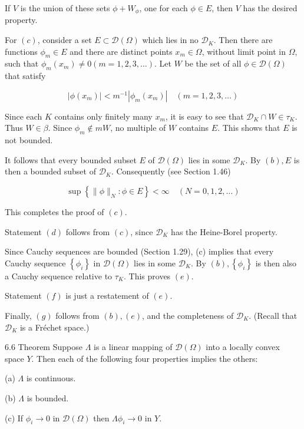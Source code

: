 \documentclass[10pt]{article}
\begin{document}
If $V$ is the union of these sets $\phi+W_{\phi}$, one for each $\phi \in E$, then $V$ has the desired property.

For $(c)$, consider a set $E \subset \mathscr{D}(\Omega)$ which lies in no $\mathscr{D}_{K}$. Then there are functions $\phi_{m} \in E$ and there are distinct points $x_{m} \in \Omega$, without limit point in $\Omega$, such that $\phi_{m}\left(x_{m}\right) \neq 0(m=1,2,3, \ldots)$. Let $W$ be the set of all $\phi \in \mathscr{D}(\Omega)$ that satisfy

$$
\left|\phi\left(x_{m}\right)\right|<m^{-1}\left|\phi_{m}\left(x_{m}\right)\right| \quad(m=1,2,3, \ldots)
$$

Since each $K$ contains only finitely many $x_{m}$, it is easy to see that $\mathscr{D}_{K} \cap W \in \tau_{K}$. Thus $W \in \beta$. Since $\phi_{m} \notin m W$, no multiple of $W$ contains $E$. This shows that $E$ is not bounded.

It follows that every bounded subset $E$ of $\mathscr{D}(\Omega)$ lies in some $\mathscr{D}_{K}$. By $(b), E$ is then a bounded subset of $\mathscr{D}_{K}$. Consequently (see Section 1.46)

$$
\sup \left\{\|\phi\|_{N}: \phi \in E\right\}<\infty \quad(N=0,1,2, \ldots)
$$

This completes the proof of $(c)$.

Statement $(d)$ follows from $(c)$, since $\mathscr{D}_{K}$ has the Heine-Borel property.

Since Cauchy sequences are bounded (Section 1.29), (c) implies that every Cauchy sequence $\left\{\phi_{i}\right\}$ in $\mathscr{D}(\Omega)$ lies in some $\mathscr{D}_{K}$. By $(b),\left\{\phi_{i}\right\}$ is then also a Cauchy sequence relative to $\tau_{K}$. This proves $(e)$.

Statement $(f)$ is just a restatement of $(e)$.

Finally, $(g)$ follows from $(b),(e)$, and the completeness of $\mathscr{D}_{K}$. (Recall that $\mathscr{D}_{K}$ is a Fréchet space.)

6.6 Theorem Suppose $\Lambda$ is a linear mapping of $\mathscr{D}(\Omega)$ into a locally convex space $Y$. Then each of the following four properties implies the others:

(a) $\Lambda$ is continuous.

(b) $\Lambda$ is bounded.

(c) If $\phi_{i} \rightarrow 0$ in $\mathscr{D}(\Omega)$ then $\Lambda \phi_{i} \rightarrow 0$ in $Y$.
\end{document}
